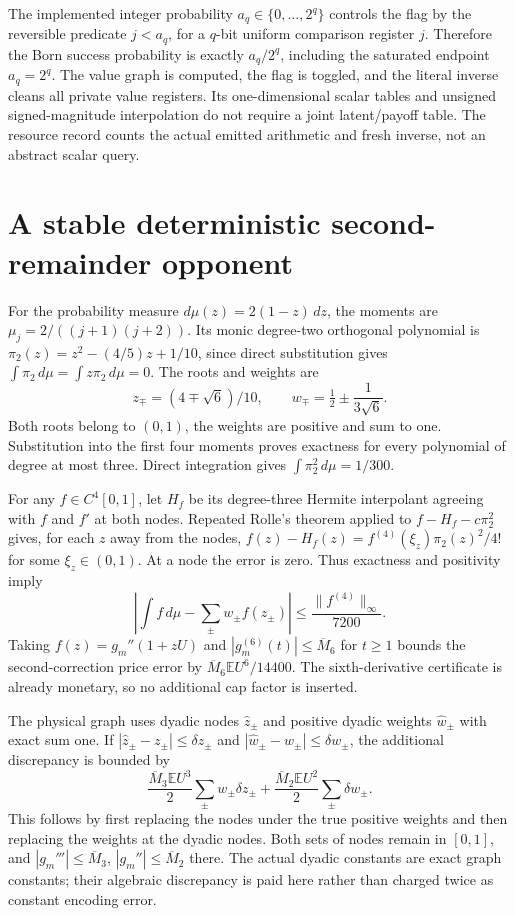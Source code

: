 The implemented integer probability $a_q\in\{0,\ldots,2^q\}$ controls the flag by the reversible predicate $j<a_q$, for a $q$-bit uniform comparison register $j$. Therefore the Born success probability is exactly $a_q/2^q$, including the saturated endpoint $a_q=2^q$. The value graph is computed, the flag is toggled, and the literal inverse cleans all private value registers. Its one-dimensional scalar tables and unsigned signed-magnitude interpolation do not require a joint latent/payoff table. The resource record counts the actual emitted arithmetic and fresh inverse, not an abstract scalar query.

\section{A stable deterministic second-remainder opponent}
For the probability measure $d\mu(z)=2(1-z)\,dz$, the moments are $\mu_j=2/((j+1)(j+2))$. Its monic degree-two orthogonal polynomial is $\pi_2(z)=z^2-(4/5)z+1/10$, since direct substitution gives $\int\pi_2\,d\mu=\int z\pi_2\,d\mu=0$. The roots and weights are
\[
 z_\mp=(4\mp\sqrt6)/10,\qquad w_\mp=\tfrac12\pm\frac1{3\sqrt6}.
\]
Both roots belong to $(0,1)$, the weights are positive and sum to one. Substitution into the first four moments proves exactness for every polynomial of degree at most three. Direct integration gives $\int\pi_2^2\,d\mu=1/300$.

For any $f\in C^4[0,1]$, let $H_f$ be its degree-three Hermite interpolant agreeing with $f$ and $f'$ at both nodes. Repeated Rolle's theorem applied to $f-H_f-c\pi_2^2$ gives, for each $z$ away from the nodes, $f(z)-H_f(z)=f^{(4)}(\xi_z)\pi_2(z)^2/4!$ for some $\xi_z\in(0,1)$. At a node the error is zero. Thus exactness and positivity imply
\[
 \left|\int f\,d\mu-\sum_\pm w_\pm f(z_\pm)\right|\leq\frac{\|f^{(4)}\|_\infty}{7200}.
\]
Taking $f(z)=g_m''(1+zU)$ and $|g_m^{(6)}(t)|\leq\overline M_6$ for $t\geq1$ bounds the second-correction price error by $\overline M_6\mathbb E U^6/14400$. The sixth-derivative certificate is already monetary, so no additional cap factor is inserted.

The physical graph uses dyadic nodes $\widehat z_\pm$ and positive dyadic weights $\widehat w_\pm$ with exact sum one. If $|\widehat z_\pm-z_\pm|\leq\delta z_\pm$ and $|\widehat w_\pm-w_\pm|\leq\delta w_\pm$, the additional discrepancy is bounded by
\[
 \frac{\overline M_3\mathbb E U^3}{2}\sum_\pm w_\pm\delta z_\pm
 +\frac{\overline M_2\mathbb E U^2}{2}\sum_\pm\delta w_\pm.
\]
This follows by first replacing the nodes under the true positive weights and then replacing the weights at the dyadic nodes. Both sets of nodes remain in $[0,1]$, and $|g_m'''|\leq\overline M_3$, $|g_m''|\leq\overline M_2$ there. The actual dyadic constants are exact graph constants; their algebraic discrepancy is paid here rather than charged twice as constant encoding error.

